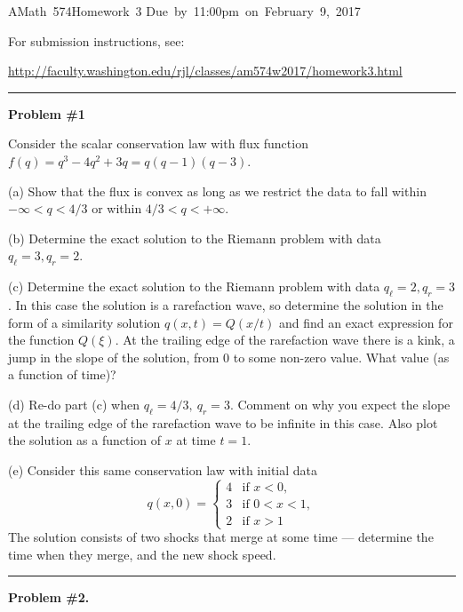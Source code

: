 \documentclass[11pt]{article}
\begin{document}
\hfill\vbox{\hbox{AMath 574}\hbox{Homework 3}
\hbox{Due by 11:00pm on February 9, 2017}}

For submission instructions, see:

\url{http://faculty.washington.edu/rjl/classes/am574w2017/homework3.html}




\vskip 1cm
\hrule
{\bf Problem \#1}

Consider the scalar conservation law with flux function $f(q) = q^3 - 4q^2 +
3q = q(q-1)(q-3)$.

(a) Show that the flux is convex as long as we restrict the data to fall
within $-\infty < q < 4/3$ or within $4/3 < q < +\infty$.

(b) Determine the exact solution to the Riemann problem with data $q_\ell =
3, q_r = 2$.  

(c) Determine the exact solution to the Riemann problem with data $q_\ell =
2, q_r = 3$.  In this case the solution is a rarefaction wave, so determine
the solution in the form of a similarity solution $q(x,t) = Q(x/t)$ and find
an exact expression for the function $Q(\xi)$. At the trailing edge of the
rarefaction wave there is a kink, a jump in the slope of the solution, from
0 to some non-zero value.  What value (as a function of time)?

(d) Re-do part (c) when $q_\ell = 4/3,~ q_r = 3$.  
Comment on why you expect the slope at the trailing edge of the rarefaction
wave to be infinite in this case.
Also plot the solution as a function of $x$ at time $t=1$.

(e) Consider this same conservation law with initial data
\[
q(x,0) = \begin{cases} 
        4 &\text{if~}x<0,\\ 
        3 &\text{if~}0<x<1,\\
        2 &\text{if~}x>1
         \end{cases}
\]
The solution consists of two shocks that merge at some time --- determine
the time when they merge, and the new shock speed.




\vskip 1cm
\hrule
{\bf Problem \#2.}
\end{document}
